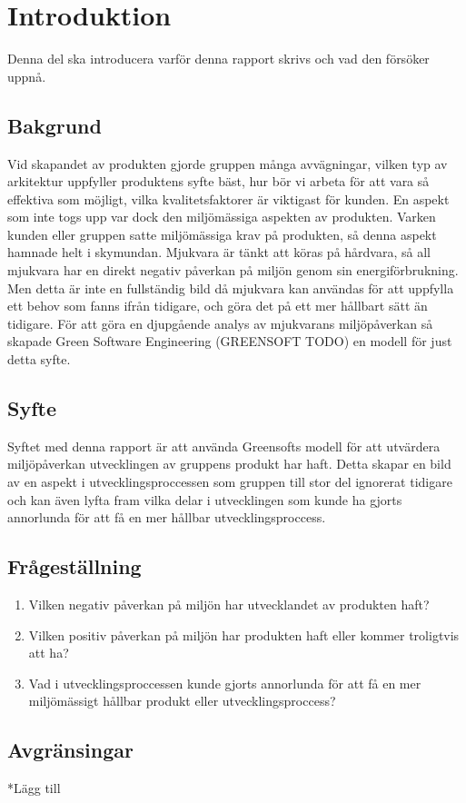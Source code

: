 \section{Introduktion}
\label{sec:joel_a-introduction}
Denna del ska introducera varför denna rapport skrivs och vad den försöker uppnå.

\subsection{Bakgrund}
Vid skapandet av produkten gjorde gruppen många avvägningar, vilken typ av arkitektur uppfyller produktens syfte bäst, hur bör vi arbeta för att vara så effektiva som möjligt, vilka kvalitetsfaktorer är viktigast för kunden. En aspekt som inte togs upp var dock den miljömässiga aspekten av produkten. Varken kunden eller gruppen satte miljömässiga krav på produkten, så denna aspekt hamnade helt i skymundan. Mjukvara är tänkt att köras på hårdvara, så all mjukvara har en direkt negativ påverkan på miljön genom sin energiförbrukning. Men detta är inte en fullständig bild då mjukvara kan användas för att uppfylla ett behov som fanns ifrån tidigare, och göra det på ett mer hållbart sätt än tidigare. För att göra en djupgående analys av mjukvarans miljöpåverkan så skapade Green Software Engineering (GREENSOFT TODO) en modell för just detta syfte.

\subsection{Syfte}
Syftet med denna rapport är att använda Greensofts modell för att utvärdera miljöpåverkan utvecklingen av gruppens produkt har haft. Detta skapar en bild av en aspekt i utvecklingsproccessen som gruppen till stor del ignorerat tidigare och kan även lyfta fram vilka delar i utvecklingen som kunde ha gjorts annorlunda för att få en mer hållbar utvecklingsproccess.



\subsection{Frågeställning}
\label{subsec:joel_a-research-questions}

\begin{enumerate}
\item Vilken negativ påverkan på miljön har utvecklandet av produkten haft?

\item Vilken positiv påverkan på miljön har produkten haft eller kommer troligtvis att ha?

\item Vad i utvecklingsproccessen kunde gjorts annorlunda för att få en mer miljömässigt hållbar produkt eller utvecklingsproccess?

\end{enumerate}

\subsection{Avgränsingar}
\label{subsec:joel_a-delimitations}

*Lägg till